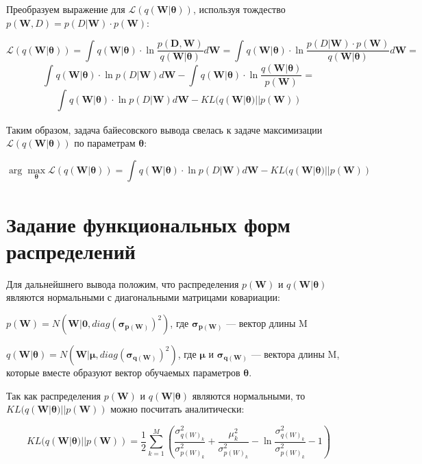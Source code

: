 \documentclass{article}
\newcommand{\argmax}{\arg\!\max}
\begin{document}
Преобразуем выражение для $\mathcal{L}(q(\mathbf{W} | \pmb{\theta}))$, используя тождество
$p(\mathbf{W}, D) = p(D | \mathbf{W}) \cdot p(\mathbf{W})$:

\[
\mathcal{L}(q(\mathbf{W} | \pmb{\theta})) =
\int_{}{} q(\mathbf{W} | \pmb{\theta}) \cdot \ln{\dfrac{p(\mathbf{D}, \mathbf{W})}{q(\mathbf{W} | \pmb{\theta})}} d\mathbf{W} =
\int_{}{} q(\mathbf{W} | \pmb{\theta}) \cdot \ln{\dfrac{p(D | \mathbf{W}) \cdot p(\mathbf{W})}{q(\mathbf{W} | \pmb{\theta})}} d\mathbf{W} =
\]\[
\int_{}{} q(\mathbf{W} | \pmb{\theta}) \cdot \ln{p(D | \mathbf{W})} d\mathbf{W} - \int_{}{} q(\mathbf{W} | \pmb{\theta}) \cdot \ln{\dfrac{q(\mathbf{W} | \pmb{\theta})}{p(\mathbf{W})}} =
\]\[
\int_{}{} q(\mathbf{W} | \pmb{\theta}) \cdot \ln{p(D | \mathbf{W})} d\mathbf{W} - KL(q(\mathbf{W} | \pmb{\theta}) || p(\mathbf{W}))
\]

Таким образом, задача байесовского вывода свелась к задаче максимизации $\mathcal{L}(q(\mathbf{W} | \pmb{\theta}))$ по параметрам $\pmb{\theta}$:

\[
\argmax_{\pmb{\theta}} \mathcal{L}(q(\mathbf{W} | \pmb{\theta})) =
\int_{}{} q(\mathbf{W} | \pmb{\theta}) \cdot \ln{p(D | \mathbf{W})} d\mathbf{W} - KL(q(\mathbf{W} | \pmb{\theta}) || p(\mathbf{W}))
\]

\section{Задание функциональных форм распределений}
Для дальнейшнего вывода положим, что распределения $p(\mathbf{W})$ и $q(\mathbf{W} | \pmb{\theta})$ являются нормальными с диагональными матрицами ковариации:

$
p(\mathbf{W}) =
N(\mathbf{W} | \mathbf{0}, diag(\pmb{\sigma_{p(\mathbf{W})}})^{2})$,
где $\pmb{\sigma_{p(\mathbf{W})}}$ — вектор длины M

$q(\mathbf{W} | \pmb{\theta}) = N(\mathbf{W} | \pmb{\mu}, diag(\pmb{\sigma_{q(\mathbf{W})}})^{2})$, где $\pmb{\mu}$ и $\pmb{\sigma_{q(\mathbf{W})}}$ — вектора длины M, которые вместе образуют вектор обучаемых параметров $\pmb{\theta}$.

Так как распределения $p(\mathbf{W})$ и $q(\mathbf{W} | \pmb{\theta})$ являются нормальными, то $KL(q(\mathbf{W} | \pmb{\theta}) || p(\mathbf{W}))$ можно посчитать аналитически:

\[
KL(q(\mathbf{W} | \pmb{\theta}) || p(\mathbf{W})) =
\dfrac{1}{2}\sum_{k=1}^{M}(\dfrac{\sigma_{{q(W)_{k}}}^2}{\sigma_{{p(W)_{k}}}^2} + \dfrac{\mu_{k}^2}{\sigma_{{p(W)_{k}}}^2} - \ln{\dfrac{\sigma_{{q(W)_{k}}}^2}{\sigma_{{p(W)_{k}}}^2}} - 1)
\]
\end{document}
